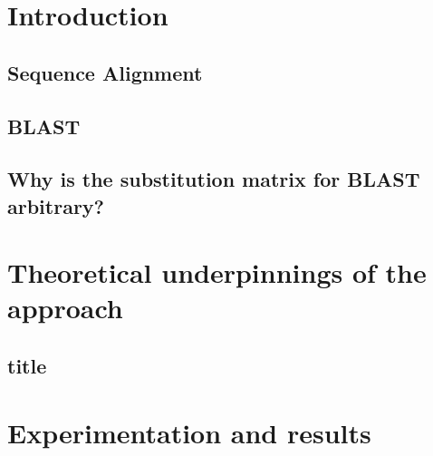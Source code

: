 \documentclass{article}
\begin{document}
\tableofcontents

\section{Introduction}
\subsection{Sequence Alignment}
\subsection{BLAST}
\subsection{Why is the substitution matrix for BLAST arbitrary?}
\section{Theoretical underpinnings of the approach}
\subsection*{title}
\section{Experimentation and results}
\end{document}

